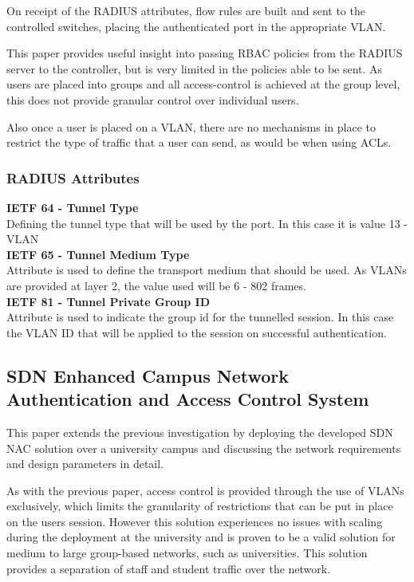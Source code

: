On receipt of the RADIUS attributes, flow rules are built and sent to the controlled switches, placing the authenticated port in the appropriate VLAN.

This paper provides useful insight into passing RBAC policies from the RADIUS server to the controller, but is very limited in the policies able to be sent. As users are placed into groups and all access-control is achieved at the group level, this does not provide granular control over individual users. 

Also once a user is placed on a VLAN, there are no mechanisms in place to restrict the type of traffic that a user can send, as would be when using ACLs.

\subsubsection{RADIUS Attributes}
\label{list:radius_attributes}
\textbf{IETF 64 - Tunnel Type} \\
Defining the tunnel type that will be used by the port. In this case it is value 13 - VLAN\\
\textbf{IETF 65 - Tunnel Medium Type}\\
Attribute is used to define the transport medium that should be used. As VLANs are provided at layer 2, the value used will be 6 - 802 frames.\\
\textbf{IETF 81 - Tunnel Private Group ID}\\
Attribute is used to indicate the group id for the tunnelled session. In this case the VLAN ID that will be applied to the session on successful authentication.\\

\subsection{SDN Enhanced Campus Network Authentication and Access Control System}
This paper extends the previous investigation\cite{vainius_sdn_nac} by deploying the developed SDN NAC solution over a university campus and discussing the network requirements and design parameters in detail.

As with the previous paper, access control is provided through the use of VLANs exclusively, which limits the granularity of restrictions that can be put in place on the users session. However this solution experiences no issues with scaling during the deployment at the university and is proven to be a valid solution for medium to large group-based networks, such as universities. This solution provides a separation of staff and student traffic over the network.\cite{vinius_sdn_campus}


